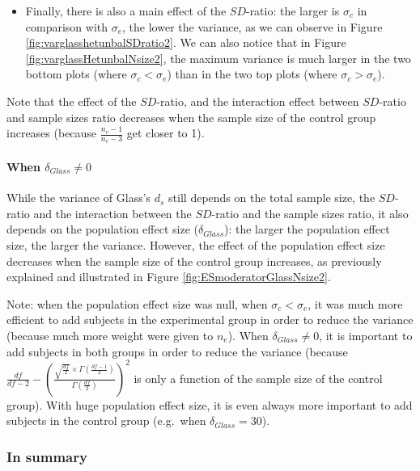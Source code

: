 \documentclass[
  man]{apa6}
\providecommand{\tightlist}{%
  \setlength{\itemsep}{0pt}\setlength{\parskip}{0pt}}
\begin{document}
\begin{itemize}
\tightlist
\item
  Finally, there is also a main effect of the \(SD\)-ratio: the larger is \(\sigma_c\) in comparison with \(\sigma_e\), the lower the variance, as we can observe in Figure \ref{fig:varglasshetunbalSDratio2}. We can also notice that in Figure \ref{fig:varglassHetunbalNsize2}, the maximum variance is much larger in the two bottom plots (where \(\sigma_c<\sigma_e\)) than in the two top plots (where \(\sigma_c>\sigma_e\)).
\end{itemize}

Note that the effect of the \(SD\)-ratio, and the interaction effect between \(SD\)-ratio and sample sizes ratio decreases when the sample size of the control group increases (because \(\frac{n_c-1}{n_c-3}\) get closer to 1).

\hypertarget{when-delta_glass-neq-0-2}{%
\paragraph{\texorpdfstring{When \(\delta_{Glass} \neq 0\)}{When \textbackslash delta\_\{Glass\} \textbackslash neq 0}}\label{when-delta_glass-neq-0-2}}

While the variance of Glass's \(d_s\) still depends on the total sample size, the \(SD\)-ratio and the interaction between the \(SD\)-ratio and the sample sizes ratio, it also depends on the population effect size (\(\delta_{Glass}\)): the larger the population effect size, the larger the variance. However, the effect of the population effect size decreases when the sample size of the control group increases, as previously explained and illustrated in Figure \ref{fig:ESmoderatorGlassNsize2}.

Note: when the population effect size was null, when \(\sigma_c<\sigma_e\), it was much more efficient to add subjects in the experimental group in order to reduce the variance (because much more weight were given to \(n_e\)). When \(\delta_{Glass} \neq 0\), it is important to add subjects in both groups in order to reduce the variance (because \(\frac{df}{df-2} - \left( \frac{\sqrt{\frac{df}{2}} \times \Gamma \left(\frac{df-1}{2} \right)}{\Gamma \left( \frac{df}{2}\right)}\right)^2\) is only a function of the sample size of the control group). With huge population effect size, it is even always more important to add subjects in the control group (e.g.~when \(\delta_{Glass}=30\)).

\hypertarget{in-summary-1}{%
\subsubsection{In summary}\label{in-summary-1}}
\end{document}
